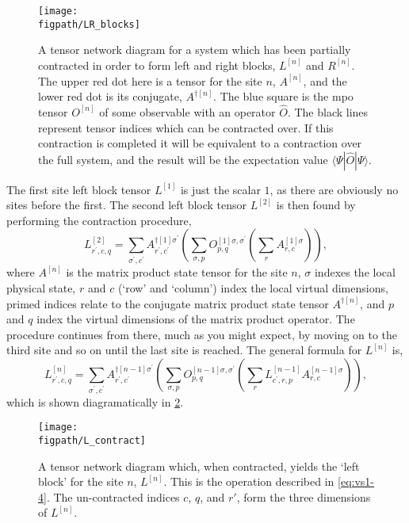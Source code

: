 \begin{figure}[ht!]
\centering
\texttt{[image: \\figpath/LR\_blocks]}
\caption{A tensor network diagram for a system which has been partially contracted in order to form left and right blocks, \(L^{[n]}\) and \(R^{[n]}\). The upper red dot here is a tensor for the site \(n\), \(A^{[n]}\), and the lower red dot is its conjugate, \(A^{\dagger [n]}\). The blue square is the mpo tensor \(O^{[n]}\) of some observable with an operator \(\hat{O}\). The black lines represent tensor indices which can be contracted over. If this contraction is completed it will be equivalent to a contraction over the full system, and the result will be the expectation value \(\langle \Psi | \hat{O} | \Psi \rangle \).}
\label{fig:vs1-2}
\end{figure}

The first site left block tensor \(L^{[1]}\) is just the scalar \(1\), as there are obviously no sites before the first. The second left block tensor \(L^{[2]}\) is then found by performing the contraction procedure,
\begin{equation}
L^{[2]}_{r^{\prime}, c, q} = \sum_{\sigma^{\prime}, c^{\prime}} A^{\dagger [1] \sigma^{\prime}}_{r^{\prime}, c^{\prime}} \left( \sum_{\sigma, p} O^{[1]  \sigma, \sigma^{\prime}}_{p, q} \left( \sum_{r} A^{[1] \sigma}_{r, c} \right) \right),
\label{eq:vs1-3}
\end{equation}
where \(A^{[n]}\) is the matrix product state tensor for the site \(n\), \(\sigma\) indexes the local physical state, \(r\) and \(c\) (`row' and `column') index the local virtual dimensions, primed indices relate to the conjugate matrix product state tensor \(A^{\dagger [n]}\), and \(p\) and \(q\) index the virtual dimensions of the matrix product operator. The procedure continues from there, much as you might expect, by moving on to the third site and so on until the last site is reached. The general formula for \(L^{[n]}\) is,
\begin{equation}
L^{[n]}_{r^{\prime}, c, q} = \sum_{\sigma^{\prime}, c^{\prime}} A^{\dagger [n-1] \sigma^{\prime}}_{r^{\prime}, c^{\prime}} \left( \sum_{\sigma, p} O^{[n-1]  \sigma, \sigma^{\prime}}_{p, q} \left( \sum_{r} L^{[n-1]}_{c^{\prime}, r, p} A^{[n-1] \sigma}_{r, c} \right) \right),
\label{eq:vs1-4}
\end{equation}
which is shown diagramatically in \cref{fig:vsTMP}.

\begin{figure}[ht!]
\centering
\texttt{[image: \\figpath/L\_contract]}
\caption{A tensor network diagram which, when contracted, yields the `left block' for the site \(n\), \(L^{[n]}\). This is the operation described in \cref{eq:vs1-4}. The un-contracted indices \(c\), \(q\), and \(r'\), form the three dimensions of \(L^{[n]}\).}
\label{fig:vsTMP}
\end{figure}


